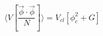 \begin{equation}
\langle V[\frac {\vec \phi \cdot \vec \phi}{N} ] \rangle = V_{cl} [ \phi_c^2
+
G ] \end{equation}

